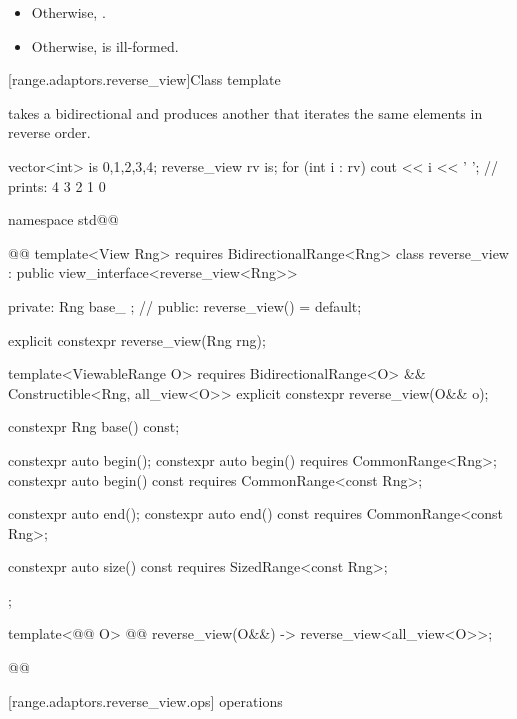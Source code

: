 {\begin{itemize}
\item Otherwise, 
.

\item Otherwise,  is ill-formed.
\end{itemize}


[range.adaptors.reverse_view]{Class template }

\pnum
{}  takes a bidirectional 
 and produces another   that
iterates the same elements in reverse order.

\pnum
\begin{example}
\begin{codeblock}
vector<int> is {0,1,2,3,4};
reverse_view rv {is};
for (int i : rv)
  cout << i << ' '; // prints: 4 3 2 1 0
\end{codeblock}
\end{example}

\begin{codeblock}
namespace std@@ { @@
  template<View Rng>
    requires BidirectionalRange<Rng>
  class reverse_view : public view_interface<reverse_view<Rng>> {
  private:
    Rng base_ {}; // \expos
  public:
    reverse_view() = default;

    explicit constexpr reverse_view(Rng rng);

    template<ViewableRange O>
      requires BidirectionalRange<O> && Constructible<Rng, all_view<O>>
    explicit constexpr reverse_view(O&& o);

    constexpr Rng base() const;

    constexpr auto begin();
    constexpr auto begin() requires CommonRange<Rng>;
    constexpr auto begin() const requires CommonRange<const Rng>;

    constexpr auto end();
    constexpr auto end() const requires CommonRange<const Rng>;

    constexpr auto size() const requires SizedRange<const Rng>;
  };

  template<@@ O>
    @@
  reverse_view(O&&) -> reverse_view<all_view<O>>;
}@\oldtxt{\}}@
\end{codeblock}

[range.adaptors.reverse_view.ops]{ operations}

}
